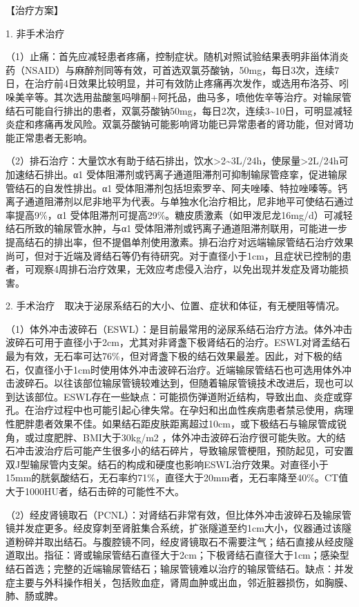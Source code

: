 【治疗方案】

1. 非手术治疗

（1）止痛：首先应减轻患者疼痛，控制症状。随机对照试验结果表明非甾体消炎药（NSAID）与麻醉剂同等有效，可首选双氯芬酸钠，50mg，每日3次，连续7日，在治疗前4日效果比较明显，并可有效防止疼痛再次发作，或选用布洛芬、吲哚美辛等。其次选用盐酸氢吗啡酮+阿托品，曲马多，喷他佐辛等治疗。对输尿管结石可能自行排出的患者，双氯芬酸钠50mg，每日2次，连续3\textasciitilde{}10日，可明显减轻炎症和疼痛再发风险。双氯芬酸钠可能影响肾功能已异常患者的肾功能，但对肾功能正常患者无影响。

（2）排石治疗：大量饮水有助于结石排出，饮水\textgreater{}2\textasciitilde{}3L/24h，使尿量\textgreater{}2L/24h可加速结石排出。α{1}
受体阻滞剂或钙离子通道阻滞剂可抑制输尿管痉挛，促进输尿管结石的自发性排出。α{1}
受体阻滞剂包括坦索罗辛、阿夫唑嗪、特拉唑嗪等。钙离子通道阻滞剂以尼非地平为代表。与单独水化治疗相比，尼非地平可使结石通过率提高9\%，α{1}
受体阻滞剂可提高29\%。糖皮质激素（如甲泼尼龙16mg/d）可减轻结石所致的输尿管水肿，与α{1}
受体阻滞剂或钙离子通道阻滞剂联用，可能进一步提高结石的排出率，但不提倡单剂使用激素。排石治疗对远端输尿管结石治疗效果尚可，但对于近端及肾结石等仍有待研究。对于直径小于1cm，且症状已控制的患者，可观察4周排石治疗效果，无效应考虑侵入治疗，以免出现并发症及肾功能损害。

2. 手术治疗　取决于泌尿系结石的大小、位置、症状和体征，有无梗阻等情况。

（1）体外冲击波碎石（ESWL）：是目前最常用的泌尿系结石治疗方法。体外冲击波碎石可用于直径小于2cm，尤其对非肾盏下极肾结石的治疗。ESWL对肾盂结石最为有效，无石率可达76\%，但对肾盏下极的结石效果最差。因此，对下极的结石，仅直径小于1cm时使用体外冲击波碎石治疗。近端输尿管结石也可选用体外冲击波碎石。以往该部位输尿管镜较难达到，但随着输尿管镜技术改进后，现也可以到达该部位。ESWL存在一些缺点：可能损伤弹道附近结构，导致出血、炎症或穿孔。在治疗过程中也可能引起心律失常。在孕妇和出血性疾病患者禁忌使用，病理性肥胖患者效果不佳。如果结石距皮肤距离超过10cm，或下极结石与输尿管成锐角，或过度肥胖、BMI大于30kg/m{2}
，体外冲击波碎石治疗很可能失败。大的结石冲击波治疗后可能产生很多小的结石碎片，导致输尿管梗阻，预防起见，可安置双J型输尿管内支架。结石的构成和硬度也影响ESWL治疗效果。对直径小于15mm的胱氨酸结石，无石率约71\%，直径大于20mm者，无石率降至40\%。CT值大于1000HU者，结石击碎的可能性不大。

（2）经皮肾镜取石（PCNL）：对肾结石非常有效，但比体外冲击波碎石及输尿管镜并发症更多。经皮穿刺至肾脏集合系统，扩张隧道至约1cm大小，仪器通过该隧道粉碎并取出结石。与腹腔镜不同，经皮肾镜取石不需要注气；结石直接从经皮隧道取出。指征：肾或输尿管结石直径大于2cm；下极肾结石直径大于1cm；感染型结石首选；完整的近端输尿管结石；输尿管镜难以治疗的输尿管结石。缺点：并发症主要与外科操作相关，包括败血症，肾周血肿或出血，邻近脏器损伤，如胸膜、肺、肠或脾。

